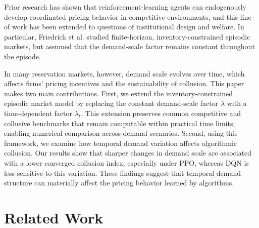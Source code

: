 \documentclass[runningheads]{llncs}
\begin{document}
Prior research has shown that reinforcement-learning agents can endogenously develop coordinated pricing behavior in competitive environments\cite{calvano2020a}, and this line of work has been extended to questions of institutional design and welfare\cite{johnson2020}. In particular, Friedrich et al.\cite{friedrich2025learning} studied finite-horizon, inventory-constrained episodic markets, but assumed that the demand-scale factor remains constant throughout the episode.

In many reservation markets, however, demand scale evolves over time, which affects firms' pricing incentives and the sustainability of collusion. This paper makes two main contributions. First, we extend the inventory-constrained episodic market model by replacing the constant demand-scale factor $\lambda$ with a time-dependent factor $\lambda_t$. This extension preserves common competitive and collusive benchmarks that remain computable within practical time limits, enabling numerical comparison across demand scenarios. Second, using this framework, we examine how temporal demand variation affects algorithmic collusion. Our results show that sharper changes in demand scale are associated with a lower converged collusion index, especially under PPO, whereas DQN is less sensitive to this variation. These findings suggest that temporal demand structure can materially affect the pricing behavior learned by algorithms.



\section{Related Work}
\end{document}
